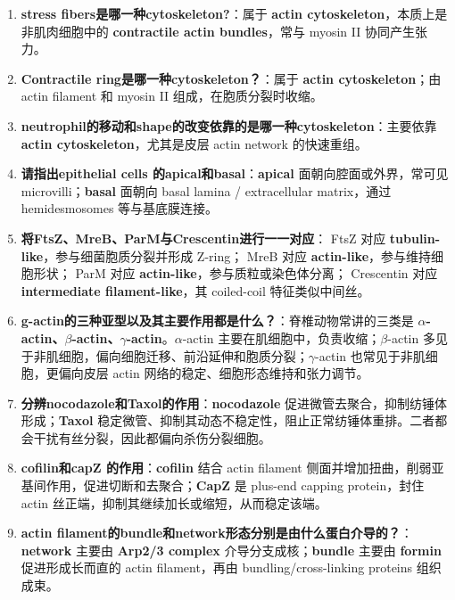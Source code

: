 \documentclass[12pt,fontset=none]{ctexart}
\begin{document}
\begin{enumerate}
\item \textbf{stress fibers是哪一种cytoskeleton?}：属于 \textbf{actin cytoskeleton}，本质上是非肌肉细胞中的 \textbf{contractile actin bundles}，常与 myosin II 协同产生张力。

\item \textbf{Contractile ring是哪一种cytoskeleton？}：属于 \textbf{actin cytoskeleton}；由 actin filament 和 myosin II 组成，在胞质分裂时收缩。

\item \textbf{neutrophil的移动和shape的改变依靠的是哪一种cytoskeleton}：主要依靠 \textbf{actin cytoskeleton}，尤其是皮层 actin network 的快速重组。

\item \textbf{请指出epithelial cells 的apical和basal}：\textbf{apical} 面朝向腔面或外界，常可见 microvilli；\textbf{basal} 面朝向 basal lamina / extracellular matrix，通过 hemidesmosomes 等与基底膜连接。

\item \textbf{将FtsZ、MreB、ParM与Crescentin进行一一对应}：
FtsZ 对应 \textbf{tubulin-like}，参与细菌胞质分裂并形成 Z-ring；
MreB 对应 \textbf{actin-like}，参与维持细胞形状；
ParM 对应 \textbf{actin-like}，参与质粒或染色体分离；
Crescentin 对应 \textbf{intermediate filament-like}，其 coiled-coil 特征类似中间丝。

\item \textbf{g-actin的三种亚型以及其主要作用都是什么？}：脊椎动物常讲的三类是 \textbf{$\alpha$-actin、$\beta$-actin、$\gamma$-actin}。$\alpha$-actin 主要在肌细胞中，负责收缩；$\beta$-actin 多见于非肌细胞，偏向细胞迁移、前沿延伸和胞质分裂；$\gamma$-actin 也常见于非肌细胞，更偏向皮层 actin 网络的稳定、细胞形态维持和张力调节。

\item \textbf{分辨nocodazole和Taxol的作用}：\textbf{nocodazole} 促进微管去聚合，抑制纺锤体形成；\textbf{Taxol} 稳定微管、抑制其动态不稳定性，阻止正常纺锤体重排。二者都会干扰有丝分裂，因此都偏向杀伤分裂细胞。

\item \textbf{cofilin和capZ 的作用}：\textbf{cofilin} 结合 actin filament 侧面并增加扭曲，削弱亚基间作用，促进切断和去聚合；\textbf{CapZ} 是 plus-end capping protein，封住 actin 丝正端，抑制其继续加长或缩短，从而稳定该端。

\item \textbf{actin filament的bundle和network形态分别是由什么蛋白介导的？}：\textbf{network} 主要由 \textbf{Arp2/3 complex} 介导分支成核；\textbf{bundle} 主要由 \textbf{formin} 促进形成长而直的 actin filament，再由 bundling/cross-linking proteins 组织成束。


\end{enumerate}
\end{document}
